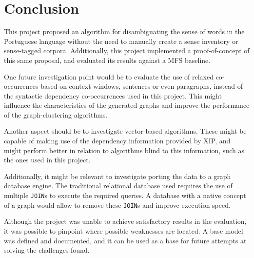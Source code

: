 \chapter{Conclusion}
\label{ch:conclusion}

This project proposed an algorithm for disambiguating the sense of words in the
Portuguese language without the need to manually create a sense inventory or
sense-tagged corpora. Additionally, this project implemented a proof-of-concept
of this same proposal, and evaluated its results against a \ac{MFS} baseline.

One future investigation point would be to evaluate the use of relaxed
co-occurrences based on context windows, sentences or even paragraphs, instead
of the syntactic dependency co-occurrences used in this project. This might
influence the characteristics of the generated graphs and improve the
performance of the graph-clustering algorithms.

Another aspect should be to investigate vector-based algorithms. These might be
capable of making use of the dependency information provided by \ac{XIP}, and
might perform better in relation to algorithms blind to this
information, such as the ones used in this project.

Additionally, it might be relevant to investigate porting the data to a graph
database engine. The traditional relational database used requires the use of
multiple \texttt{JOIN}s to execute the required queries. A database with a
native concept of a graph would allow to remove these \texttt{JOIN}s and improve
execution speed.

Although the project was unable to achieve satisfactory results in the
evaluation, it was possible to pinpoint where possible weaknesses are located.
A base model was defined and documented, and it can be used as a base for future
attempts at solving the challenges found.

